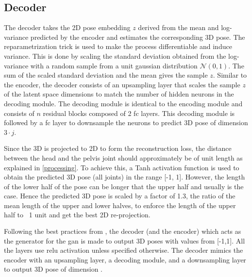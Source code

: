 \subsection{Decoder}

The decoder takes the 2D pose embedding $z$ derived from the mean and log-variance predicted by the encoder and estimates the corresponding 3D pose. The reparametrization trick is used to make the process differentiable and induce variance. This is done by scaling the standard deviation obtained from the log-variance with a random sample from a unit gaussian distribution $\mathcal{N}(0,1)$. The sum of the scaled standard deviation and the mean gives the sample $z$. Similar to the encoder, the decoder consists of an upsampling layer that scales the sample $z$ of the latent space dimensions to match the number of hidden neurons in the decoding module. The decoding module is identical to the encoding module and consists of $n$ residual blocks composed of 2 \ac{fc} layers. This decoding module is followed by a \ac{fc} layer to downsample the neurons to predict 3D pose of dimension $3 \cdot j$. 

Since the 3D is projected to 2D to form the reconstruction loss, the distance between the head and the pelvis joint should approximately be of unit length as explained in \ref{processing}. To achieve this, a Tanh activation function is used to obtain the predicted 3D pose (all joints) in the range [-1, 1]. However, the length of the lower half of the pose can be longer that the upper half and usually is the case. Hence the predicted 3D pose is scaled by a factor of 1.3, the ratio of the mean length of the upper and lower halves, to enforce the length of the upper half to ~1 unit and get the best 2D re-projection.




Following the best practices from \cite{soumith2017wasserstein}, the decoder (and the encoder) which acts as the generator for the \ac{gan} is made to output 3D poses with values from [-1,1]. 
All the layers use \ac{relu} activation unless specified otherwise. The decoder mimics the encoder with an upsampling layer, a decoding module, and a downsampling layer to output 3D pose of dimension .



